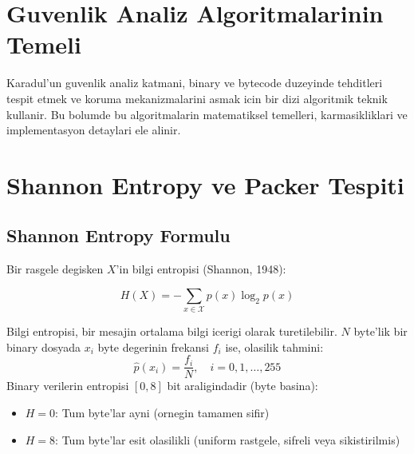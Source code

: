 \newpage

%
%

\section{Guvenlik Analiz Algoritmalarinin Temeli}
\label{sec:security-giris}

Karadul'un guvenlik analiz katmani, binary ve bytecode duzeyinde
tehditleri tespit etmek ve koruma mekanizmalarini asmak icin
bir dizi algoritmik teknik kullanir. Bu bolumde bu algoritmalarin
matematiksel temelleri, karmasikliklari ve implementasyon detaylari
ele alinir.


\section{Shannon Entropy ve Packer Tespiti}
\label{sec:entropy-packer}

\subsection{Shannon Entropy Formulu}

Bir rasgele degisken $X$'in bilgi entropisi (Shannon, 1948):

\begin{equation}
  H(X) = -\sum_{x \in \mathcal{X}} p(x) \log_2 p(x)
  \label{eq:shannon-entropy}
\end{equation}

\begin{tanim}
Bilgi entropisi, bir mesajin ortalama bilgi icerigi olarak turetilebilir.
$N$ byte'lik bir binary dosyada $x_i$ byte degerinin frekans\-i $f_i$ ise,
olasilik tahmini:
\begin{equation}
  \hat{p}(x_i) = \frac{f_i}{N}, \quad i = 0, 1, \ldots, 255
  \label{eq:byte-prob}
\end{equation}
Binary verilerin entropisi $[0, 8]$ bit araligindadir (byte basina):
\begin{itemize}
  \item $H = 0$: Tum byte'lar ayni (ornegin tamamen sifir)
  \item $H = 8$: Tum byte'lar esit olasilikli (uniform rastgele, sifreli veya sikistirilmis)
\end{itemize}
\end{tanim}

